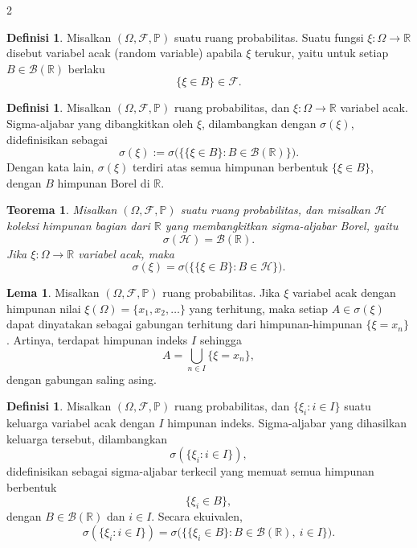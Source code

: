 \documentclass[a4paper,extrafontsizes, 9pt]{memoir}
\theoremstyle{definition}
\newtheorem{definisi}[kalstok]{Definisi}
\newtheorem{lemma}[kalstok]{Lema}
\theoremstyle{plain}
\newtheorem{teorema}[kalstok]{Teorema}
\theoremstyle{remark}
\begin{document}
\begin{multicols}{2}
  \begin{definisi}
    Misalkan $(\Omega,\mathcal{F},\mathbb{P})$ suatu ruang probabilitas.
    Suatu fungsi $\xi:\Omega\to\mathbb{R}$ disebut variabel acak (random variable) apabila $\xi$ terukur,
    yaitu untuk setiap $B\in\mathcal{B}(\mathbb{R})$ berlaku
    \[\{\xi\in B\}\in\mathcal{F}.\]
  \end{definisi}

  \begin{definisi}
    Misalkan $(\Omega,\mathcal{F},\mathbb{P})$ ruang probabilitas, dan $\xi:\Omega\to\mathbb{R}$ variabel acak.
    Sigma-aljabar yang dibangkitkan oleh $\xi$, dilambangkan dengan $\sigma(\xi)$, didefinisikan sebagai
    \[\sigma(\xi):=\sigma\bigl(\{\{\xi\in B\}:B\in\mathcal{B}(\mathbb{R})\}\bigr).\]
    Dengan kata lain, $\sigma(\xi)$ terdiri atas semua himpunan berbentuk $\{\xi\in B\}$,
    dengan $B$ himpunan Borel di $\mathbb{R}$.
  \end{definisi}

  \begin{teorema}
    Misalkan $(\Omega,\mathcal{F},\mathbb{P})$ suatu ruang probabilitas, dan misalkan $\mathcal{H}$
    koleksi himpunan bagian dari $\mathbb{R}$ yang membangkitkan sigma-aljabar Borel, yaitu
    \[\sigma(\mathcal{H})=\mathcal{B}(\mathbb{R}).\]
    Jika $\xi:\Omega\to\mathbb{R}$ variabel acak, maka
    \[\sigma(\xi)=\sigma\bigl(\{\{\xi\in B\}:B\in\mathcal{H}\}\bigr).\]
  \end{teorema}

  \begin{lemma}
    Misalkan $(\Omega,\mathcal{F},\mathbb{P})$ ruang probabilitas. Jika $\xi$ variabel acak dengan
    himpunan nilai $\xi(\Omega)=\{x_1,x_2,\ldots\}$ yang terhitung, maka setiap $A\in\sigma(\xi)$ dapat
    dinyatakan sebagai gabungan terhitung dari himpunan-himpunan $\{\xi=x_n\}$.
    Artinya, terdapat himpunan indeks $I$ sehingga
    \[A=\bigcup_{n\in I}\{\xi=x_n\},\]
    dengan gabungan saling asing.
  \end{lemma}

  \begin{definisi}
    Misalkan $(\Omega,\mathcal{F},\mathbb{P})$ ruang probabilitas, dan
    $\{\xi_i:i\in I\}$ suatu keluarga variabel acak dengan $I$ himpunan indeks.
    Sigma-aljabar yang dihasilkan keluarga tersebut, dilambangkan
    \[\sigma(\{\xi_i:i\in I\}),\]
    didefinisikan sebagai sigma-aljabar terkecil yang memuat semua himpunan berbentuk
    \[\{\xi_i\in B\},\]
    dengan $B\in\mathcal{B}(\mathbb{R})$ dan $i\in I$.
    Secara ekuivalen,
    \[\sigma(\{\xi_i:i\in I\})=\sigma\bigl(\{\{\xi_i\in B\}:B\in\mathcal{B}(\mathbb{R}),\ i\in I\}\bigr).\]
  \end{definisi}


\end{multicols}
\end{document}
